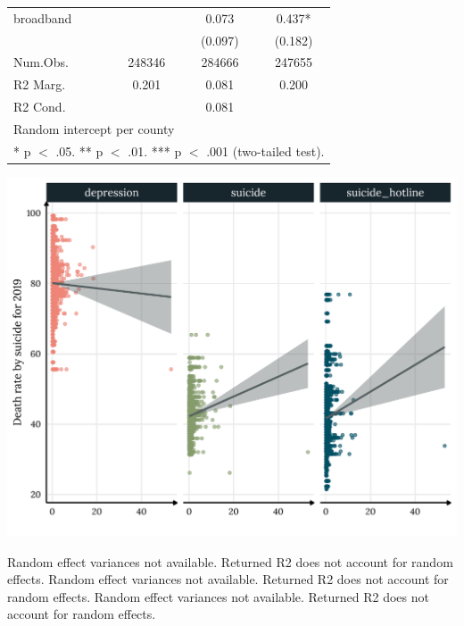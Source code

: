 \documentclass[
]{article}
\begin{document}
\begin{table}
\begin{tabular}[t]{lccc}
broadband &  & \num{0.073} & \num{0.437}*\\
 &  & (\num{0.097}) & (\num{0.182})\\
\midrule
Num.Obs. & \num{248346} & \num{284666} & \num{247655}\\
R2 Marg. & \num{0.201} & \num{0.081} & \num{0.200}\\
R2 Cond. &  & \num{0.081} & \\
\bottomrule
\multicolumn{4}{l}{\rule{0pt}{1em}Random intercept per county}\\
\multicolumn{4}{l}{\rule{0pt}{1em}* p $<$ .05. ** p $<$ .01. *** p $<$ .001 (two-tailed test).}\\
\end{tabular}
\end{table}

\begin{center}\includegraphics[width=0.8\linewidth]{paper1_files/figure-latex/suicide_plot-1} \end{center}

Random effect variances not available. Returned R2 does not account for
random effects. Random effect variances not available. Returned R2 does
not account for random effects. Random effect variances not available.
Returned R2 does not account for random effects.
\end{document}
